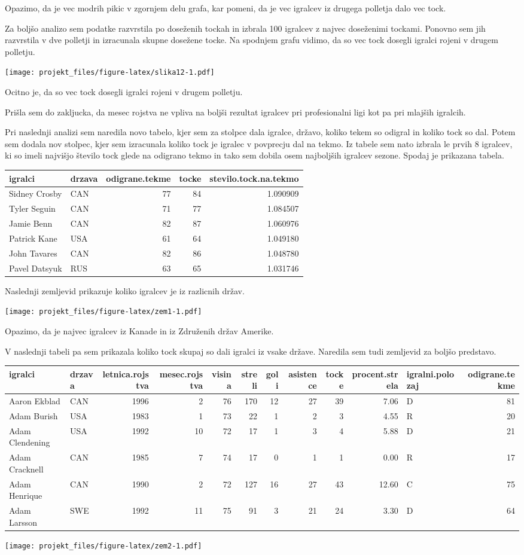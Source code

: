 \documentclass[]{article}
\begin{document}
Opazimo, da je vec modrih pikic v zgornjem delu grafa, kar pomeni, da je
vec igralcev iz drugega polletja dalo vec tock.

Za boljšo analizo sem podatke razvrstila po doseženih tockah in izbrala
100 igralcev z najvec doseženimi tockami. Ponovno sem jih razvrstila v
dve polletji in izracunala skupne dosežene tocke. Na spodnjem grafu
vidimo, da so vec tock dosegli igralci rojeni v drugem polletju.

\texttt{[image: projekt\_files/figure-latex/slika12-1.pdf]}

Ocitno je, da so vec tock dosegli igralci rojeni v drugem polletju.

Prišla sem do zakljucka, da mesec rojstva ne vpliva na boljši rezultat
igralcev pri profesionalni ligi kot pa pri mlajših igralcih.

Pri naslednji analizi sem naredila novo tabelo, kjer sem za stolpce dala
igralce, državo, koliko tekem so odigral in koliko tock so dal. Potem
sem dodala nov stolpec, kjer sem izracunala koliko tock je igralec v
povprecju dal na tekmo. Iz tabele sem nato izbrala le prvih 8 igralcev,
ki so imeli najvišjo število tock glede na odigrano tekmo in tako sem
dobila osem najboljših igralcev sezone. Spodaj je prikazana tabela.

\begin{longtable}[c]{@{}llrrr@{}}
\toprule
igralci & drzava & odigrane.tekme & tocke &
stevilo.tock.na.tekmo\tabularnewline
\midrule
\endhead
Sidney Crosby & CAN & 77 & 84 & 1.090909\tabularnewline
Tyler Seguin & CAN & 71 & 77 & 1.084507\tabularnewline
Jamie Benn & CAN & 82 & 87 & 1.060976\tabularnewline
Patrick Kane & USA & 61 & 64 & 1.049180\tabularnewline
John Tavares & CAN & 82 & 86 & 1.048780\tabularnewline
Pavel Datsyuk & RUS & 63 & 65 & 1.031746\tabularnewline
\bottomrule
\end{longtable}

Naslednji zemljevid prikazuje koliko igralcev je iz razlicnih držav.

\texttt{[image: projekt\_files/figure-latex/zem1-1.pdf]}

Opazimo, da je najvec igralcev iz Kanade in iz Združenih držav Amerike.

V naslednji tabeli pa sem prikazala koliko tock skupaj so dali igralci
iz vsake države. Naredila sem tudi zemljevid za boljšo predstavo.

\begin{longtable}[c]{@{}llrrrrrrrrlr@{}}
\toprule
igralci & drzava & letnica.rojstva & mesec.rojstva & visina & streli &
goli & asistence & tocke & procent.strela & igralni.polozaj &
odigrane.tekme\tabularnewline
\midrule
\endhead
Aaron Ekblad & CAN & 1996 & 2 & 76 & 170 & 12 & 27 & 39 & 7.06 & D &
81\tabularnewline
Adam Burish & USA & 1983 & 1 & 73 & 22 & 1 & 2 & 3 & 4.55 & R &
20\tabularnewline
Adam Clendening & USA & 1992 & 10 & 72 & 17 & 1 & 3 & 4 & 5.88 & D &
21\tabularnewline
Adam Cracknell & CAN & 1985 & 7 & 74 & 17 & 0 & 1 & 1 & 0.00 & R &
17\tabularnewline
Adam Henrique & CAN & 1990 & 2 & 72 & 127 & 16 & 27 & 43 & 12.60 & C &
75\tabularnewline
Adam Larsson & SWE & 1992 & 11 & 75 & 91 & 3 & 21 & 24 & 3.30 & D &
64\tabularnewline
\bottomrule
\end{longtable}

\texttt{[image: projekt\_files/figure-latex/zem2-1.pdf]}
\end{document}
